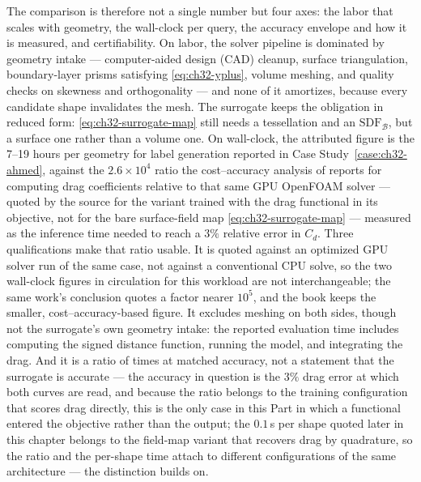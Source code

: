 The comparison is therefore not a single number but four axes: the labor that scales with
geometry, the wall-clock per query, the accuracy envelope and how it is measured, and
certifiability.
On labor, the solver pipeline is dominated by geometry intake --- computer-aided design (CAD)
cleanup, surface triangulation, boundary-layer prisms satisfying \eqref{eq:ch32-yplus}, volume
meshing, and quality checks on skewness and orthogonality --- and none of it amortizes, because
every candidate shape invalidates the mesh. The surrogate keeps the obligation in reduced form:
\eqref{eq:ch32-surrogate-map} still needs a tessellation and an $\mathrm{SDF}_{\mathcal{B}}$,
but a surface one rather than a volume one. On wall-clock, the attributed figure is
the 7--19 hours per geometry for label generation reported in Case
Study~\ref{case:ch32-ahmed}, against the
$2.6\times10^{4}$ ratio the cost--accuracy analysis of \cite{li2023geometry} reports for
computing drag coefficients relative to that same GPU OpenFOAM solver --- quoted by the source for
the variant trained with the drag functional in its objective, not for the bare surface-field map
\eqref{eq:ch32-surrogate-map} --- measured as
the inference time needed to reach a $3\%$ relative error in $C_d$.
Three qualifications make
that ratio usable. It is quoted against an optimized GPU solver run of the same case, not against
a conventional CPU solve, so the two wall-clock figures in circulation for this workload are not
interchangeable; the same work's
conclusion quotes a factor nearer $10^{5}$, and the book keeps the smaller, cost--accuracy-based
figure. It excludes meshing on both sides, though not the surrogate's own geometry intake: the
reported evaluation time includes computing the signed distance function, running the model, and
integrating the drag. And it is a ratio of times at matched accuracy, not a
statement that the surrogate is accurate --- the accuracy in question is the $3\%$ drag error at
which both curves are read, and because the ratio belongs to the training configuration that
scores drag directly, this is the only case in this Part in which a functional
entered the objective rather than the output; the $0.1$\,s per shape quoted later in this
chapter belongs to the field-map variant that recovers drag by quadrature, so the ratio
and the per-shape time attach to different configurations of the same architecture --- the
distinction  builds on.

